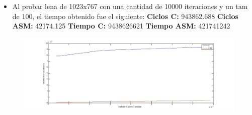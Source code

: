 \documentclass[10pt, a4paper]{article}
\begin{document}
\begin{itemize}
\begin{itemize}
\item{Al probar lena de 1023x767 con una cantidad de 10000 iteraciones y un tam de 100, el tiempo obtenido fue el siguiente:\newline
\newline
\textbf{Ciclos C:}                  943862.688\newline
\vspace{0.15cm}
\textbf{Ciclos ASM:}               42174.125\newline
\textbf{Tiempo C:}                 9438626621\newline
\textbf{Tiempo ASM:}               421741242\newline}

\end{itemize}

\begin{figure}[H] %
\begin{center}
\includegraphics[width=560pt]{./ciclosRecortar.jpg}
\end{center}
\end{figure}


\end{itemize}
\end{document}
